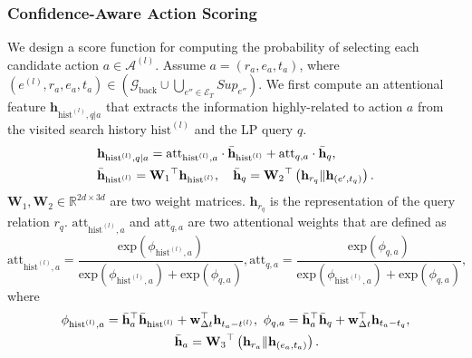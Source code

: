 \documentclass[runningheads]{llncs}
\begin{document}
\subsubsection{Confidence-Aware Action Scoring}
We design a score function for computing the probability of selecting each candidate action $a \in \mathcal{A}^{(l)}$. Assume $a=(r_a, e_a, t_a)$, where $(e^{(l)}, r_a, e_a, t_a) \in (\mathcal{G}_{\text{back}} \cup \bigcup_{e'' \in \mathcal{E}_T} Sup_{e''})$. We first compute an attentional feature $\mathbf{h}_{\text{hist}^{(l)}, q|a}$ that extracts the information highly-related to action $a$ from the visited search history $\text{hist}^{(l)}$ and the LP query $q$.
\begin{equation}
\label{eq: attentional feature}
\begin{aligned}
        &\mathbf{h}_{\text{hist}^{(l)}, q|a} = \text{att}_{\text{hist}^{(l)}, a} \cdot \Bar{\mathbf{h}}_{\text{hist}^{(l)}} + \text{att}_{q, a} \cdot \Bar{\mathbf{h}}_{q}, \\
        &\Bar{\mathbf{h}}_{\text{hist}^{(l)}} = {\mathbf{W}_1}^\top\mathbf{h}_{\text{hist}^{(l)}}, \quad
        \Bar{\mathbf{h}}_{q} = {\mathbf{W}_2}^\top\left(\mathbf{h}_{r_q}\|\mathbf{h}_{(e', t_q)}\right).
\end{aligned}
\end{equation}
$\mathbf{W}_1, \mathbf{W}_2 \in \mathbb{R}^{2d \times 3d}$ are two weight matrices. $\mathbf{h}_{r_q}$ is the representation of the query relation $r_q$. $\text{att}_{\text{hist}^{(l)},a}$ and $\text{att}_{q,a}$ are two attentional weights that are defined as
\begin{equation}
    \text{att}_{\text{hist}^{(l)},a} = \frac{\text{exp}(\phi_{\text{hist}^{(l)},a})} {\text{exp}(\phi_{\text{hist}^{(l)},a})+\text{exp}(\phi_{q,a})}, \text{att}_{q,a} = \frac{\text{exp}(\phi_{q,a})}{\text{exp}(\phi_{\text{hist}^{(l)},a})+\text{exp}(\phi_{q,a})},
\end{equation}
where
\begin{equation}
    \begin{aligned}
        \phi_{\text{hist}^{(l)},a} = {\Bar{\mathbf{h}}_a}^\top \Bar{\mathbf{h}}_{\text{hist}^{(l)}} &+ \mathbf{w}_{\Delta t}^\top \mathbf{h}_{t_a - t^{(l)}}, \ 
        \phi_{q,a} = {\Bar{\mathbf{h}}_a}^\top \Bar{\mathbf{h}}_{q} + \mathbf{w}_{\Delta t}^\top \mathbf{h}_{t_a - t_q},\\
        &\Bar{\mathbf{h}}_a = {\mathbf{W}_3}^\top\left(\mathbf{h}_{r_a}\|\mathbf{h}_{(e_a, t_a)}\right).
    \end{aligned}
\end{equation}
\end{document}
